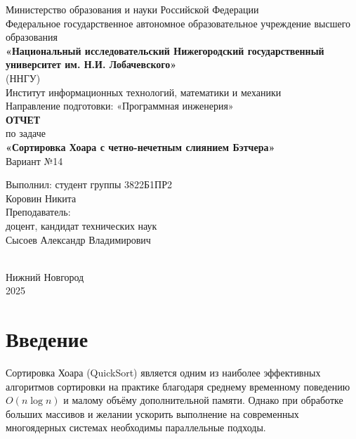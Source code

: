 \documentclass[12pt]{article}
\begin{document}
\begin{titlepage}
    \centering
    \large
    Министерство образования и науки Российской Федерации\\
    Федеральное государственное автономное образовательное учреждение высшего образования\\
    \textbf{«Национальный исследовательский Нижегородский государственный университет им. Н.И. Лобачевского»}\\
    (ННГУ)\\[1cm]
    Институт информационных технологий, математики и механики\\
    Направление подготовки: «Программная инженерия»\\[2cm]
    
    {\Large \textbf{ОТЧЕТ}}\\[0.5cm]
    {\Large по задаче}\\[0.5cm]
    {\Large \textbf{«Сортировка Хоара с четно-нечетным слиянием Бэтчера»}}\\[0.5cm]
    {\Large Вариант №14}\\[4cm]
    
    \hfill\parbox{0.5\textwidth}{
        Выполнил: студент группы 3822Б1ПР2\\
        Коровин Никита\\[1.5em]
        Преподаватель:\\
        доцент, кандидат технических наук\\
        Сысоев Александр Владимирович
    }\\[3cm]
    
    \vspace*{\fill}
    Нижний Новгород\\
    2025
\end{titlepage}

\thispagestyle{empty}
\clearpage
{} 
\setcounter{page}{2} 
\tableofcontents
\clearpage
\setcounter{page}{3} 

\section{Введение}
\hspace*{1.25em}Сортировка Хоара (QuickSort) является одним из наиболее эффективных алгоритмов сортировки на практике благодаря среднему временному поведению $O(n\log n)$ и малому объёму дополнительной памяти. Однако при обработке больших массивов и желании ускорить выполнение на современных многоядерных системах необходимы параллельные подходы. 
\end{document}

